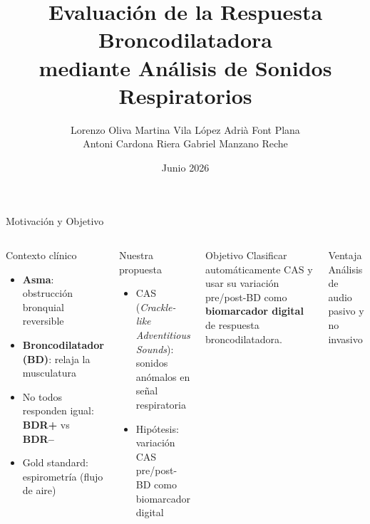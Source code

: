 ﻿\documentclass[aspectratio=169,10pt]{beamer}
\title[CAS como biomarcador BD]{%
  Evaluación de la Respuesta Broncodilatadora\\
  mediante Análisis de Sonidos Respiratorios}
\author[Oliva \textperiodcentered{} Vila \textperiodcentered{} Font \textperiodcentered{} Cardona \textperiodcentered{} Manzano]{%
  \footnotesize
  Lorenzo Oliva \enspace\textperiodcentered\enspace
  Martina Vila López \enspace\textperiodcentered\enspace
  Adrià Font Plana \\
  Antoni Cardona Riera \enspace\textperiodcentered\enspace
  Gabriel Manzano Reche}
\institute[UPC]{Digital Biomarkers}
\date{Junio 2026}
\begin{document}
\begin{frame}
  \titlepage
\end{frame}

\begin{frame}{Motivación y Objetivo}
  \begin{columns}
      \begin{block}{Contexto clínico}
        \begin{itemize}
          \item \textbf{Asma}: obstrucción bronquial reversible
          \item \textbf{Broncodilatador (BD)}: relaja la musculatura
          \item No todos responden igual: \textbf{BDR+} vs \textbf{BDR--}
          \item Gold standard: \alert{espirometría} (flujo de aire)
        \end{itemize}
      \end{block}
      \begin{block}{Nuestra propuesta}
        \begin{itemize}
          \item CAS (\textit{Crackle-like Adventitious Sounds}): sonidos anómalos en señal respiratoria
          \item Hipótesis: variación CAS pre/post-BD como biomarcador digital
        \end{itemize}
      \end{block}
      \begin{block}{Objetivo}
        Clasificar automáticamente CAS y usar su variación pre/post-BD como \textbf{biomarcador digital} de respuesta broncodilatadora.
      \end{block}
      \begin{alertblock}{Ventaja}
        Análisis de audio pasivo y no invasivo
      \end{alertblock}
  \end{columns}
\end{frame}
\end{document}
